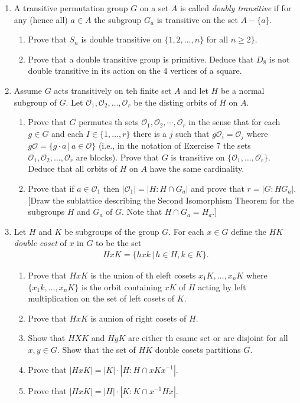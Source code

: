 \documentclass[10pt,a4paper]{report}
\begin{document}
\begin{enumerate}
	\item A transitive permutation group $G$ on a set $A$ is called \textit{doubly transitive} if for any (hence all) $a \in A$ the subgroup $G_a$ is transitive on the set $A-\{a\}$.
	\begin{enumerate}
		\item Prove that $S_n$ is double transitive on $\{1,2,\dots, n\}$ for all $n \ge 2\}$.
		\item Prove that a double transitive group is primitive. Deduce that $D_8$ is not double transitive in its action on the 4 vertices of a square.
	\end{enumerate}
	
	\item Assume $G$ acts transitively on teh finite set $A$ and let $H$ be a normal subgroup of $G$.  Let $\mathcal{O}_1,\mathcal{O}_2,\dots,\mathcal{O}_r$ be the disting orbits of $H$ on $A$.
	\begin{enumerate}
		\item Prove that $G$ permutes th sets $\mathcal{O}_1,\mathcal{O}_2,\cdots,\mathcal{O}_r$ in the sense that for each $g \in G$ and each $I\in\{1,\dots,r\}$ there is a $j$ such that $g\mathcal{O}_i=\mathcal{O}_j$ where $g\mathcal{O}=\{g\cdot a\,|\,a \in \mathcal{O}\}$ (i.e., in the notation of Exercise 7 the sets $\mathcal{O}_1,\mathcal{O}_2,\dots,\mathcal{O}_r$ are blocks).  Prove that $G$ is transitive on $\{\mathcal{O}_1,\dots,\mathcal{O}_r\}$.  Deduce that all orbits of $H$ on $A$ have the same cardinality.
		\item Prove that if $a \in \mathcal{O}_1$ then $|\mathcal{O}_1|=|H:H\cap G_a|$ and prove that $r = |G:HG_a|$.[Draw the sublattice describing the Second Isomorphism Theorem for the subgroups $H$ and $G_a$ of $G$.  Note that $H \cap G_a=H_a$.]
	\end{enumerate}
	
	\item Let $H$ and $K$ be subgroups of the group $G$.  For each $x \in G$ define the $HK$ \textit{double coset} of $x$ in $G$ to be the set 
	\begin{align*}
		HxK=\{hxk\,|\,h\in H, k\in K\}.
	\end{align*}
	
	\begin{enumerate}
		\item Prove that $HxK$ is the union of th eleft cosets $x_1K, \dots, x_nK$ where $\{x_1k, \dots, x_nK\}$ is the orbit containing $xK$ of $H$ acting by left multiplication on the set of left cosets of $K$.
		\item Prove that $HxK$ is aunion of right cosets of $H$.
		\item Show that $HXK$ and $HyK$ are either th esame set or are disjoint for all $x,y\in G$.  Show that the set of $HK$ double cosets partitions $G$.
		\item Prove that $|HxK| = |K|\cdot|H:H\cap xKx^{-1}|$.
		\item Prove that $|HxK| = |H|\cdot|K:K\cap x^{-1}Hx|$.
	\end{enumerate}
	
\end{enumerate}
\end{document}
